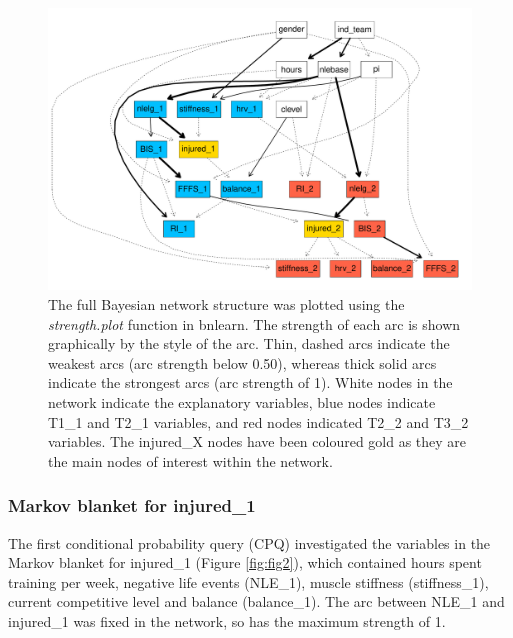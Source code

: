 \documentclass[
  english,
  man]{apa6}
\begin{document}
\begin{figure}
\centering
\includegraphics{manuscript_files/figure-latex/fig1-1.pdf}
\caption{\label{fig:fig1}The full Bayesian network structure was plotted using the \emph{strength.plot} function in bnlearn. The strength of each arc is shown graphically by the style of the arc. Thin, dashed arcs indicate the weakest arcs (arc strength below 0.50), whereas thick solid arcs indicate the strongest arcs (arc strength of 1). White nodes in the network indicate the explanatory variables, blue nodes indicate T1\_1 and T2\_1 variables, and red nodes indicated T2\_2 and T3\_2 variables. The injured\_X nodes have been coloured gold as they are the main nodes of interest within the network.}
\end{figure}

\hypertarget{markov-blanket-for-injured_1}{%
\subsubsection{Markov blanket for injured\_1}\label{markov-blanket-for-injured_1}}

The first conditional probability query (CPQ) investigated the variables in the Markov blanket for injured\_1 (Figure \ref{fig:fig2}), which contained hours spent training per week, negative life events (NLE\_1), muscle stiffness (stiffness\_1), current competitive level and balance (balance\_1).
The arc between NLE\_1 and injured\_1 was fixed in the network, so has the maximum strength of 1.
\end{document}
